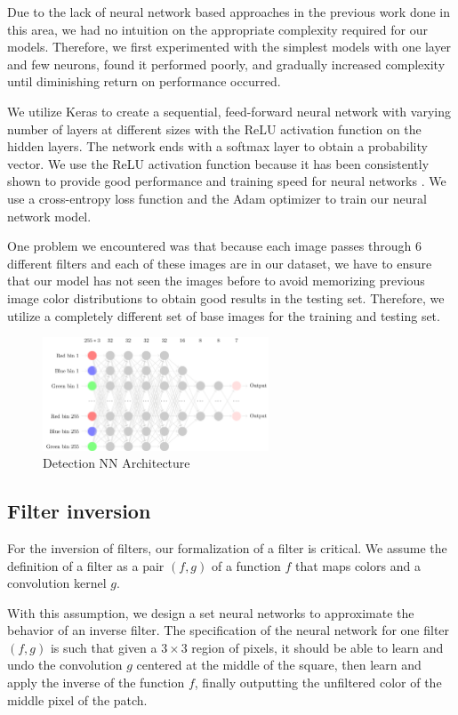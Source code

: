 \documentclass[11pt]{article}
\begin{document}
Due to the lack of neural network based approaches in the previous work done in this area, we had no intuition on the appropriate complexity required for our models. Therefore, we first experimented with the simplest models with one layer and few neurons, found it performed poorly, and gradually increased complexity until diminishing return on performance occurred.

We utilize Keras \cite{Keras} to create a sequential, feed-forward neural network with varying number of layers at different sizes with the ReLU activation function on the hidden layers. The network ends with a softmax layer to obtain a probability vector. We use the ReLU activation function because it has been consistently shown to provide good performance and training speed for neural networks \cite{ReLU}. We use a cross-entropy loss function and the Adam optimizer \cite{Adam} to train our neural network model.

One problem we encountered was that because each image passes through 6 different filters and each of these images are in our dataset, we have to ensure that our model has not seen the images before to avoid memorizing previous image color distributions to obtain good results in the testing set. Therefore, we utilize a completely different set of base images for the training and testing set.

\begin{figure}[H]
    \centering
    \includegraphics[width=0.6\textwidth]{images/detection-nn.png}
    \caption{Detection NN Architecture}
    \label{fig:detection_nn}
\end{figure}

\subsection*{Filter inversion}
For the inversion of filters, our formalization of a filter is critical. We assume the definition of a filter as a pair $(f, g)$ of a function $f$ that maps colors and a convolution kernel $g$.

With this assumption, we design a set neural networks to approximate the behavior of an inverse filter. The specification of the neural network for one filter $(f, g)$ is such that given a $3 \times 3$ region of pixels, it should be able to learn and undo the convolution $g$ centered at the middle of the square, then learn and apply the inverse of the function $f$, finally outputting the unfiltered color of the middle pixel of the patch.
\end{document}
